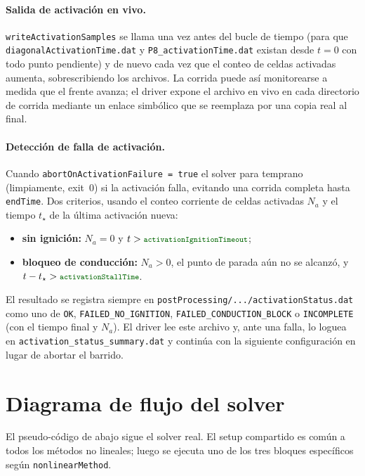 \documentclass[11pt,a4paper]{article}
\newcommand{\code}[1]{\texttt{\small #1}}
\newcommand{\dictkey}[1]{\textcolor{black!60!green}{\texttt{\footnotesize #1}}}
\begin{document}
\paragraph{Salida de activación en vivo.}
\code{writeActivationSamples} se llama una vez antes del bucle de tiempo (para que
\code{diagonalActivationTime.dat} y \code{P8\_activationTime.dat} existan desde $t=0$
con todo punto pendiente) y de nuevo cada vez que el conteo de celdas activadas
aumenta, sobrescribiendo los archivos. La corrida puede así monitorearse a medida
que el frente avanza; el driver expone el archivo en vivo en cada directorio de
corrida mediante un enlace simbólico que se reemplaza por una copia real al final.

\paragraph{Detección de falla de activación.}
Cuando \dictkey{abortOnActivationFailure = true} el solver para temprano
(limpiamente, exit~0) si la activación falla, evitando una corrida completa hasta
\code{endTime}. Dos criterios, usando el conteo corriente de celdas activadas $N_a$
y el tiempo $t_\star$ de la última activación nueva:
\begin{itemize}[topsep=2pt,itemsep=1pt]
  \item \textbf{sin ignición:} $N_a=0$ y
        $t>\dictkey{activationIgnitionTimeout}$;
  \item \textbf{bloqueo de conducción:} $N_a>0$, el punto de parada aún no se
        alcanzó, y $t-t_\star>\dictkey{activationStallTime}$.
\end{itemize}
El resultado se registra siempre en
\code{postProcessing/.../activationStatus.dat} como uno de \code{OK},
\code{FAILED\_NO\_IGNITION}, \code{FAILED\_CONDUCTION\_BLOCK} o \code{INCOMPLETE}
(con el tiempo final y $N_a$). El driver lee este archivo y, ante una falla, lo
loguea en \code{activation\_status\_summary.dat} y continúa con la siguiente
configuración en lugar de abortar el barrido.

\section{Diagrama de flujo del solver}

El pseudo-código de abajo sigue el solver real. El setup compartido es común a todos
los métodos no lineales; luego se ejecuta uno de los tres bloques específicos según
\dictkey{nonlinearMethod}.
\end{document}
